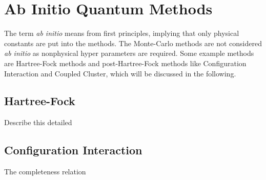 \chapter{Ab Initio Quantum Methods}
The term \textit{ab initio} means from first principles, implying that only physical constants are put into the methods. The Monte-Carlo methods are not considered \textit{ab initio} as nonphysical hyper parameters are required. Some example methods are Hartree-Fock methods and post-Hartree-Fock methods like Configuration Interaction and Coupled Cluster, which will be discussed in the following. 

\section{Hartree-Fock} \label{sec:hf}
Describe this detailed

\section{Configuration Interaction} \label{subsec:ci}
The completeness relation

